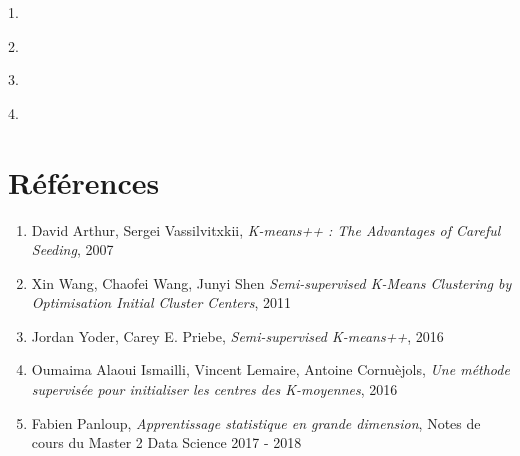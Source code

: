 \documentclass[12pt,a4paper]{book}
\newcommand{\1}{\mathds{1}}
\begin{document}
\noindent






\vspace{5mm}
\noindent

\begin{description}
  \item 1. 
  \item 2. 
  \item 3. 
  \item 4.
\end{description}




\section*{Références}

\begin{enumerate}
	\item David Arthur, Sergei Vassilvitxkii, \textit{K-means++ : The Advantages of Careful Seeding}, 2007 \\
	\item Xin Wang, Chaofei Wang, Junyi Shen \textit{Semi-supervised K-Means Clustering by Optimisation Initial Cluster Centers}, 2011 \\
	\item Jordan Yoder, Carey E. Priebe, \textit{Semi-supervised K-means++}, 2016 \\
	\item Oumaima Alaoui Ismailli, Vincent Lemaire, Antoine Cornuèjols, \textit{Une méthode supervisée pour initialiser les centres des K-moyennes}, 2016 \\
	\item Fabien Panloup, \textit{Apprentissage statistique en grande dimension}, Notes de cours du Master 2 Data Science 2017 - 2018
\end{enumerate}
\end{document}
